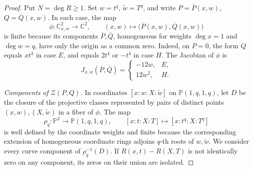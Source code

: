 \documentclass[11pt,letterpaper]{article}
\numberwithin{equation}{section}
\theoremstyle{remark}
\theoremstyle{plain}
\newcommand{\C}{\mathbb{C}}
\begin{document}
\begin{proof}
Put $N=\deg R\geq1$.  Set $w=t^q$, $\widetilde w=T^q$, and write
$P=\overline P(x,w)$, $Q=\overline Q(x,w)$.  In each case, the map
\[
 \phi:\C^2_{x,w}\longrightarrow\C^2,\qquad
 (x,w)\longmapsto\bigl(\overline P(x,w),\overline Q(x,w)\bigr)
\]
is finite because its components $\overline P,\overline Q$, homogeneous
for weights $\deg x=1$ and $\deg w=q$, have only the origin as a common zero.
Indeed, on $P=0$, the form $Q$ equals
$xt^3$ in case $E$, and equals $2t^4$ or $-t^4$ in
case $H$.  The Jacobian of $\phi$ is
\[
 J_{x,w}(\overline P,\overline Q)=
 \begin{cases}-12w,&E,\\12w^2,&H.\end{cases}
\]

\smallskip
\noindent\emph{Components of $\mathcal Z(P,Q)$.}
In coordinates $[x:w:X:\widetilde w]$ on $\mathbb P(1,q,1,q)$,
let $D$ be the closure of the projective
classes represented by pairs of distinct points $(x,w),(X,\widetilde w)$
in a fiber of $\phi$.
The map
\[
 \rho_q:\mathbb P^3\longrightarrow\mathbb P(1,q,1,q),\qquad
 [x:t:X:T]\longmapsto[x:t^q:X:T^q]
\]
is well defined by the coordinate weights and finite because the
corresponding extension of homogeneous coordinate rings adjoins $q$-th
roots of $w,\widetilde w$.  We consider every curve component of
$\rho_q^{-1}(D)$.  If $R(x,t)-R(X,T)$ is
not identically zero on any component, its zeros on their union are isolated.


\end{proof}
\end{document}
